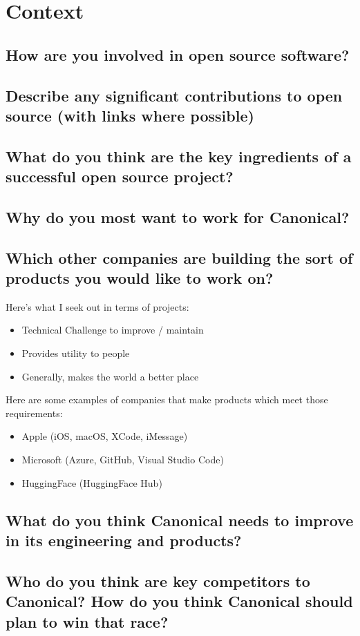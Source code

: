 \documentclass{article}
\begin{document}
\section{Context}
\subsection{How are you involved in open source software?}
\subsection{Describe any significant contributions to open source (with links where possible)}
\subsection{What do you think are the key ingredients of a successful open source project?}
\subsection{Why do you most want to work for Canonical?}
\subsection{Which other companies are building the sort of products you would like to work on?}
Here's what I seek out in terms of projects:
\begin{itemize}
    \item Technical Challenge to improve / maintain
    \item Provides utility to people
    \item Generally, makes the world a better place
\end{itemize}
Here are some examples of companies that make products which meet those requirements:
\begin{itemize}
    \item Apple (iOS, macOS, XCode, iMessage)
    \item Microsoft (Azure, GitHub, Visual Studio Code)
    \item HuggingFace (HuggingFace Hub)
\end{itemize}
\subsection{What do you think Canonical needs to improve in its engineering and products?}
\subsection{Who do you think are key competitors to Canonical? How do you think Canonical should plan to win that race?}
\end{document}
